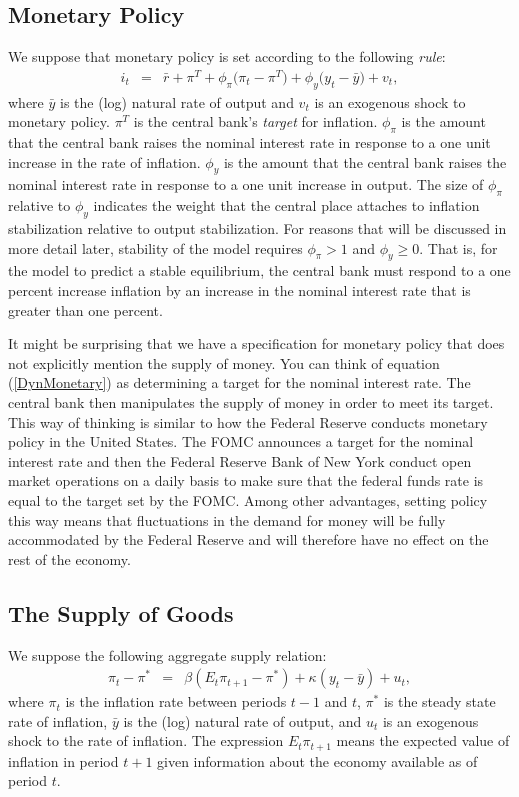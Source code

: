 \documentclass[12pt,fleqn]{article}
\newcommand{\EE}{\begin{eqnarray}}
\newcommand{\FF}{\end{eqnarray}}
\begin{document}
\subsection{Monetary Policy}

We suppose that monetary policy is set according to the following \emph{rule}:
	\EE
	i_{t} & = & \bar{r} + \pi^T + \phi_{\pi}\big(\pi_t - \pi^T\big) + \phi_{y}\big(y_t - \bar{y}\big) + v_t,  \label{DynMonetary}
	\FF
where $\bar{y}$ is the (log) natural rate of output and $v_t$ is an exogenous shock to monetary policy. $\pi^T$ is the central bank's \emph{target} for inflation. $\phi_{\pi}$ is the amount that the central bank raises the nominal interest rate in response to a one unit increase in the rate of inflation. $\phi_{y}$ is the amount that the central bank raises the nominal interest rate in response to a one unit increase in output. The size of $\phi_{\pi}$ relative to $\phi_y$ indicates the weight that the central place attaches to inflation stabilization relative to output stabilization. For reasons that will be discussed in more detail later, stability of the model requires $\phi_{\pi}>1$ and $\phi_y\geqslant0$. That is, for the model to predict a stable equilibrium, the central bank must respond to a one percent increase inflation by an increase in the nominal interest rate that is greater than one percent.

It might be surprising that we have a specification for monetary policy that does not explicitly mention the supply of money. You can think of equation (\ref{DynMonetary}) as determining a target for the nominal interest rate. The central bank then manipulates the supply of money in order to meet its target. This way of thinking is similar to how the Federal Reserve conducts monetary policy in the United States. The FOMC announces a target for the nominal interest rate and then the Federal Reserve Bank of New York conduct open market operations on a daily basis to make sure that the federal funds rate is equal to the target set by the FOMC. Among other advantages, setting policy this way means that fluctuations in the demand for money will be fully accommodated by the Federal Reserve and will therefore have no effect on the rest of the economy.


\subsection{The Supply of Goods}

We suppose the following aggregate supply relation:
	\EE
	\pi_t -\pi^* & = & \beta \left( E_t\pi_{t+1} - \pi^*\right)  + \kappa (y_t -\bar{y})+ u_t, \label{eqn:DynAS}
	\FF
where $\pi_t$ is the inflation rate between periods $t-1$ and $t$, $\pi^*$ is the steady state rate of inflation, $\bar{y}$ is the (log) natural rate of output, and $u_t$ is an exogenous shock to the rate of inflation. The expression $E_t \pi_{t+1}$ means the expected value of inflation in period $t+1$ given information about the economy available as of period $t$.
\end{document}
